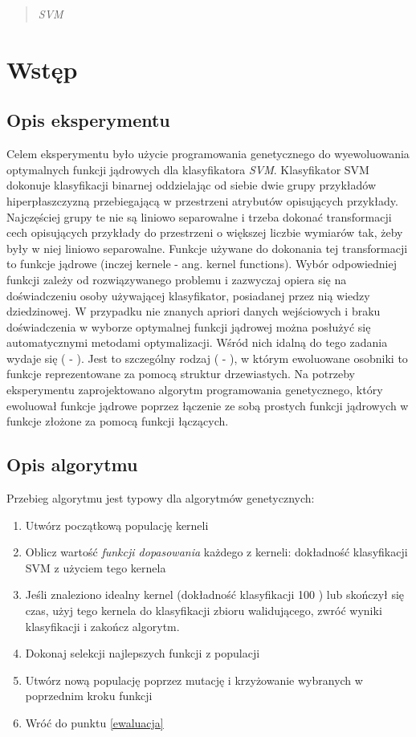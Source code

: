 \documentclass{article}
\begin{document}


\begin{abstract}
\emph{SVM} 
\end{abstract}


\section{Wstęp}
	\subsection{Opis eksperymentu}
	Celem eksperymentu było użycie programowania genetycznego do wyewoluowania optymalnych funkcji jądrowych dla klasyfikatora \emph{SVM}.
	Klasyfikator SVM dokonuje klasyfikacji binarnej oddzielając od siebie dwie grupy przykładów hiperpłaszczyzną przebiegającą w przestrzeni atrybutów opisujących przykłady. Najczęściej grupy te nie są liniowo separowalne i trzeba dokonać transformacji cech opisujących przykłady do przestrzeni o większej liczbie wymiarów tak, żeby były w niej liniowo separowalne. Funkcje używane do dokonania tej transformacji to funkcje jądrowe  (inczej kernele  - ang. kernel functions). Wybór odpowiedniej funkcji zależy od rozwiązywanego problemu i zazwyczaj opiera się na doświadczeniu osoby używającej klasyfikator, posiadanej przez nią wiedzy dziedzinowej. W przypadku nie znanych apriori danych wejściowych i braku doświadczenia w wyborze optymalnej funkcji jądrowej można posłużyć się automatycznymi metodami optymalizacji. Wśród nich idalną do tego zadania wydaje się  ( - ). Jest to szczególny rodzaj  ( - ), w którym ewoluowane osobniki to funkcje reprezentowane za pomocą struktur drzewiastych.
	Na potrzeby eksperymentu zaprojektowano algorytm programowania genetycznego, który ewoluował funkcje jądrowe poprzez łączenie ze sobą prostych funkcji jądrowych w funkcje złożone za pomocą funkcji łączących.

\subsection{Opis algorytmu}
	Przebieg algorytmu jest typowy dla algorytmów genetycznych:
\begin{enumerate}
\item Utwórz początkową populację kerneli
\item \label{ewaluacja} Oblicz wartość \textit{funkcji dopasowania} każdego z kerneli: dokładność klasyfikacji SVM z użyciem tego kernela
\item Jeśli znaleziono idealny kernel (dokładność klasyfikacji 100 ) lub skończył się czas, użyj tego kernela do klasyfikacji zbioru walidującego, zwróć wyniki klasyfikacji i zakończ algorytm.
\item Dokonaj selekcji najlepszych funkcji z populacji
\item Utwórz nową populację poprzez mutację i krzyżowanie wybranych w poprzednim kroku funkcji
\item Wróć do punktu \ref{ewaluacja}
\end{enumerate}
\end{document}
